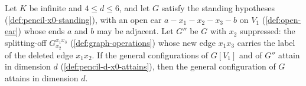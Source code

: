 \begin{theorem}
  \label{thm:pencil-d-open-ear-three}
  \leanok
  Let $K$ be infinite and $4 \le d \le 6$, and let $G$ satisfy the
  standing hypotheses (\cref{def:pencil-x0-standing}), with an open ear
  $a - x_1 - x_2 - x_3 - b$ on $V_1$ (\cref{def:open-ear}) whose ends $a$
  and $b$ may be adjacent. Let $G''$ be $G$ with $x_2$ suppressed: the
  splitting-off $G_{x_2}^{x_1 x_3}$ (\cref{def:graph-operations}) whose
  new edge $x_1 x_3$ carries the label of the deleted edge $x_1 x_2$. If
  the general configurations of $G[V_1]$ and of $G''$ attain in dimension
  $d$ (\cref{def:pencil-d-x0-attains}), then the general configuration of
  $G$ attains in dimension $d$.
\end{theorem}
